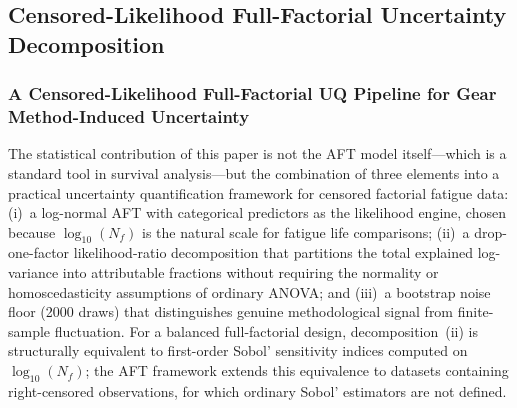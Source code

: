 \documentclass[twocolumn,12pt,a4paper]{article}
\begin{document}
\subsection{Censored-Likelihood Full-Factorial Uncertainty Decomposition}

\subsubsection{A Censored-Likelihood Full-Factorial UQ Pipeline for Gear Method-Induced Uncertainty}

The statistical contribution of this paper is not the AFT model
itself---which is a standard tool in survival analysis---but the
combination of three elements into a practical uncertainty
quantification framework for censored factorial fatigue data:
(i)~a log-normal AFT with categorical predictors as the likelihood
engine, chosen because $\log_{10}(N_f)$ is the natural scale for
fatigue life comparisons; (ii)~a drop-one-factor likelihood-ratio
decomposition that partitions the total explained log-variance into
attributable fractions without requiring the normality or
homoscedasticity assumptions of ordinary ANOVA; and (iii)~a bootstrap
noise floor (2000 draws) that distinguishes genuine methodological
signal from finite-sample fluctuation. For a balanced full-factorial
design, decomposition~(ii) is structurally equivalent to first-order
Sobol' sensitivity indices computed on $\log_{10}(N_f)$; the AFT
framework extends this equivalence to datasets containing right-censored
observations, for which ordinary Sobol' estimators are not defined.
\end{document}
